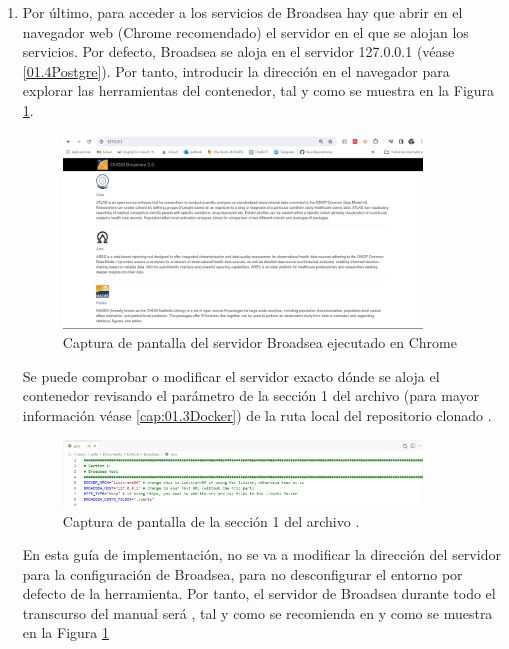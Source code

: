 \begin{enumerate}
    \item Por último, para acceder a los servicios de Broadsea hay que abrir en el navegador web (Chrome recomendado) el servidor en el que se alojan los servicios. Por defecto, Broadsea se aloja en el servidor 127.0.0.1 (véase \ref{01.4Postgre}).  Por tanto, introducir la dirección en el navegador para explorar las herramientas del contenedor, tal y como se muestra en la Figura \ref{fig:broadseaCap}.

    \begin{figure}[H]
    \centering
    \includegraphics[width=0.90\textwidth]{figures/broadseaCap.png}
     \caption{Captura de pantalla del servidor Broadsea ejecutado en Chrome}
    \label{fig:broadseaCap}
\end{figure}
    
    Se puede comprobar o modificar el servidor exacto dónde se aloja el contenedor revisando el parámetro  de la sección 1 del archivo  (para mayor información véase \ref{cap:01.3Docker}) de la ruta local del repositorio clonado . 

\begin{figure}[H]
    \centering
    \includegraphics[width=0.90\textwidth]{figures/seccion1env.png}
    \caption{Captura de pantalla de la sección 1 del archivo .}
    \label{fig:seccion1env}    
\end{figure}

    En esta guía de implementación, no se va a modificar la dirección del servidor para la configuración de Broadsea, para no desconfigurar el entorno por defecto de la herramienta. Por tanto, el servidor de Broadsea durante todo el transcurso del manual será , tal y como se recomienda en \cite{githubBroadseaDB} y como se muestra en la Figura \ref{fig:broadseaCap} 

\end{enumerate}

